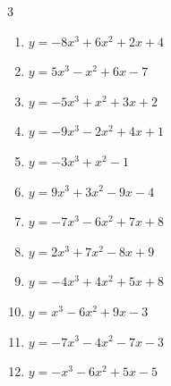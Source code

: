 \begin{multicols}{3}
\begin{enumerate}
  \item $y=-8x^{3}+6x^{2}+2x+4$


  \item $y=5x^{3}-x^{2}+6x-7$


  \item $y=-5x^{3}+x^{2}+3x+2$


  \item $y=-9x^{3}-2x^{2}+4x+1$


\columnbreak %

\resetques

  \item $y=-3x^{3}+x^{2}-1$


  \item $y=9x^{3}+3x^{2}-9x-4$


  \item $y=-7x^{3}-6x^{2}+7x+8$


  \item $y=2x^{3}+7x^{2}-8x+9$


  \item $y=-4x^{3}+4x^{2}+5x+8$


  \item $y=x^{3}-6x^{2}+9x-3$


  \item $y=-7x^{3}-4x^{2}-7x-3$


  \item $y=-x^{3}-6x^{2}+5x-5$



\end{enumerate}
\end{multicols}
